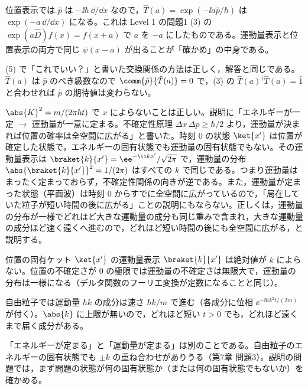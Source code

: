 \begin{rikai}
  \item 位置表示では $\hat{p}$ は $-\ii\hbar\,\dd/\dd x$ なので，$\hat{T}(a)=\exp(-\ii a\hat{p}/\hbar)$ は $\exp(-a\,\dd/\dd x)$ になる。これは Level 1 の問題1 (3) の $\exp(a\hat{D})f(x)=f(x+a)$ で $a$ を $-a$ にしたものである。運動量表示と位置表示の両方で同じ $\psi(x-a)$ が出ることが「確かめ」の中身である。
  \item (5) で「これでいい？」と書いた交換関係の方法は正しく，解答と同じである。$\hat{T}(a)$ は $\hat{p}$ のべき級数なので $\comm{\hat{p}}{\hat{T}(a)}=0$ で，(3) の $\hat{T}(a)^{\dagger}\hat{T}(a)=\hat{1}$ と合わせれば $\hat{p}$ の期待値は変わらない。
\end{rikai}
\begin{kotaeran}
   $\abs{K}^{2}=m/(2\pi\hbar t)$ で $x$ によらないことは正しい。説明に「エネルギーが一定 $\to$ 運動量が一意に定まる。不確定性原理 $\Delta x\,\Delta p\ge\hbar/2$ より，運動量が決まれば位置の確率は全空間に広がる」と書いた。時刻 $0$ の状態 $\ket{x'}$ は位置が確定した状態で，エネルギーの固有状態でも運動量の固有状態でもない。その運動量表示は $\braket{k}{x'}=\ee^{-\ii kx'}/\sqrt{2\pi}$ で，運動量の分布 $\abs{\braket{k}{x'}}^{2}=1/(2\pi)$ はすべての $k$ で同じである。つまり運動量はまったく定まっておらず，不確定性関係の向きが逆である。また，運動量が定まった状態（平面波）は時刻 $0$ からすでに全空間に広がっているので，「局在していた粒子が短い時間の後に広がる」ことの説明にもならない。正しくは，運動量の分布が一様でどれほど大きな運動量の成分も同じ重みで含まれ，大きな運動量の成分ほど速く遠くへ進むので，どれほど短い時間の後にも全空間に広がる，と説明する。
\end{kotaeran}
\begin{rikai}
  \item 位置の固有ケット $\ket{x'}$ の運動量表示 $\braket{k}{x'}$ は絶対値が $k$ によらない。位置の不確定さが $0$ の極限では運動量の不確定さは無限大で，運動量の分布は一様になる（デルタ関数のフーリエ変換が定数になることと同じ）。
  \item 自由粒子では運動量 $\hbar k$ の成分は速さ $\hbar k/m$ で進む（各成分に位相 $\ee^{-\ii\hbar k^{2}t/(2m)}$ が付く）。$\abs{k}$ に上限が無いので，どれほど短い $t>0$ でも，どれほど遠くまで届く成分がある。
  \item 「エネルギーが定まる」と「運動量が定まる」は別のことである。自由粒子のエネルギーの固有状態でも $\pm k$ の重ね合わせがありうる（第7章 問題3）。説明の問題では，まず問題の状態が何の固有状態か（または何の固有状態でもないか）を確かめる。
\end{rikai}
